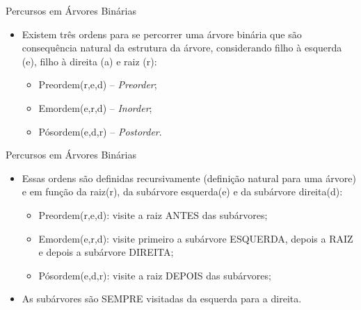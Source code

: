 \documentclass[12pt,table,xcolor={dvipsnames}]{beamer}
\begin{document}
\begin{frame}[fragile]{Percursos em Árvores Binárias}
          \begin{itemize}
          \item Existem três ordens para se percorrer uma árvore binária que são consequência natural da estrutura da árvore, considerando filho à esquerda (e), filho à direita (a) e raiz (r):
          \begin{itemize}
          \item Preordem(r,e,d) – \textit{Preorder};
          \item Emordem(e,r,d) – \textit{Inorder};
          \item Pósordem(e,d,r) – \textit{Postorder}.
          \end{itemize}
       	  \end{itemize}
\end{frame}

\begin{frame}[fragile]{Percursos em Árvores Binárias}
          \begin{itemize}
          \item Essas ordens são definidas recursivamente (definição natural para uma árvore) e em função da raiz(r), da subárvore esquerda(e) e da subárvore direita(d):
          \begin{itemize}
          \item Preordem(r,e,d): visite a raiz ANTES das subárvores;
          \item Emordem(e,r,d): visite primeiro a subárvore ESQUERDA, depois a RAIZ e depois a subárvore DIREITA;
          \item Pósordem(e,d,r): visite a raiz DEPOIS das subárvores;
          \end{itemize}
          \item As subárvores são SEMPRE visitadas da esquerda para a direita.
       	  \end{itemize}
\end{frame}
\end{document}
